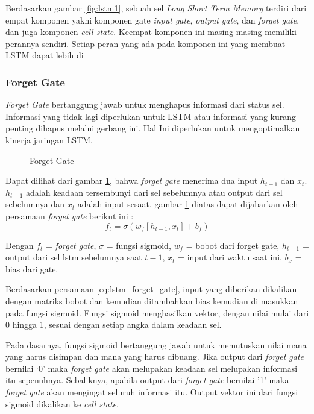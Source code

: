 \documentclass[./skripsi.tex]{subfiles}
\begin{document}
\par Berdasarkan gambar \ref{fig:lstm1}, sebuah sel \textit{Long Short Term Memory} terdiri dari empat komponen yakni komponen gate \textit{input gate}, \textit{output gate}, dan \textit{forget gate}, dan juga komponen \textit{cell state}. Keempat komponen ini masing-masing memiliki perannya sendiri. Setiap peran yang ada pada komponen ini yang membuat LSTM dapat lebih di

\subsubsection{Forget Gate}\label{bab2:lstmforgetgate}
\par \textit{Forget Gate} bertanggung jawab untuk menghapus informasi dari status sel. Informasi yang tidak lagi diperlukan untuk LSTM atau informasi yang kurang penting dihapus melalui gerbang ini. Hal Ini diperlukan untuk mengoptimalkan kinerja jaringan LSTM.

\begin{figure}[H]
    \centering
    \caption{Forget Gate}
    \label{fig:lstm_forget_gate}
\end{figure}
\par Dapat dilihat dari gambar \ref{fig:lstm_forget_gate}, bahwa \textit{forget gate} menerima dua input $h_{t-1}$ dan $x_t$.  $h_{t-1}$ adalah keadaan tersembunyi dari sel sebelumnya atau output dari sel sebelumnya dan $x_t$ adalah input sesaat. gambar \ref{fig:lstm_forget_gate} diatas dapat dijabarkan oleh persamaan \textit{forget gate} berikut ini :
\begin{equation}
    f_t = \sigma (w_f[h_{t-1},x_t]+b_f)
    \label{eq:lstm_forget_gate}
\end{equation}

\par Dengan $f_t$ = \textit{forget gate}, $\sigma$ = fungsi sigmoid, $w_f$ = bobot dari forget gate, $h_{t-1}$ = output dari sel lstm sebelumnya saat $t-1$, $x_t$ = input dari waktu saat ini, $b_x$ = bias dari gate.
\par Berdasarkan persamaan \ref{eq:lstm_forget_gate}, input yang diberikan dikalikan dengan matriks bobot dan kemudian ditambahkan bias kemudian di masukkan pada fungsi sigmoid. Fungsi sigmoid menghasilkan vektor, dengan nilai mulai dari 0 hingga 1, sesuai dengan setiap angka dalam keadaan sel. 
\par Pada dasarnya, fungsi sigmoid bertanggung jawab untuk memutuskan nilai mana yang harus disimpan dan mana yang harus dibuang. Jika output dari \textit{forget gate} bernilai ‘0’ maka \textit{forget gate} akan melupakan keadaan sel melupakan informasi itu sepenuhnya. Sebaliknya, apabila output dari \textit{forget gate} bernilai '1' maka \textit{forget gate} akan mengingat seluruh informasi itu. Output vektor ini dari fungsi sigmoid dikalikan ke \textit{cell state}.
\end{document}
